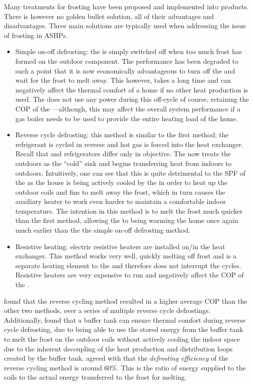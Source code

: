 Many treatments for frosting have been proposed and implemented into products. There is however no golden bullet solution, all of their advantages and disadvantages. Three main solutions are typically used when addressing the issue of frosting in \acp{ASHP}. 
\begin{itemize}
    \item Simple on-off defrosting: the \HP is simply switched off when too much frost has formed on the outdoor component. The performance has been degraded to such a point that it is now economically advantageous to turn off the \HP and wait for the frost to melt away. This however, takes a long time and can negatively affect the thermal comfort of a home if no other heat production is used. The \HP does not use any power during this off-cycle of course, retaining the \ac{COP} of the \HP---although, this may affect the overall system performance if a gas boiler needs to be used to provide the entire heating load of the home.
    \item Reverse cycle defrosting: this method is similar to the first method; the refrigerant is cycled in reverse and hot gas is forced into the heat exchanger. Recall that \HPs and refrigerators differ only in objective. The \HP now treats the outdoors as the ``cold'' sink and begins transferring heat from indoors to outdoors. Intuitively, one can see that this is quite detrimental to the \ac{SPF} of the \HP as the house is being actively cooled by the \HP in order to heat up the outdoor coils and fins to melt away the frost, which in turn causes the auxiliary heater to work even harder to maintain a comfortable indoor temperature. The intention in this method is to melt the frost much quicker than the first method, allowing the \ASHP to being warming the home once again much earlier than the the simple on-off defrosting method.
    \item Resistive heating: electric resistive heaters are installed on/in the heat exchanger. This method works very well, quickly melting off frost and is a separate heating element to the \HP and therefore does not interrupt the \HPs cycles. Resistive heaters are very expensive to run and negatively affect the \ac{COP} of the \HP.
\end{itemize}

\cite{amer_review_2017} found that the reverse cycling method resulted in a higher average \ac{COP} than the other two methods, over a series of multiple reverse cycle defrostings. Additionally, \cite{bagarella_annual_2016} found that a buffer tank can ensure thermal comfort during reverse cycle defrosting, due to being able to use the stored energy from the buffer tank to melt the frost on the outdoor coils without actively cooling the indoor space due to the inherent decoupling of the heat production and distribution loops created by the buffer tank. \cite{bagarella_annual_2016} agreed with \cite{dong_2012} that the \textit{defrosting efficiency} of the reverse cycling method is around 60\%. This is the ratio of energy supplied to the coils to the actual energy transferred to the frost for melting. 

